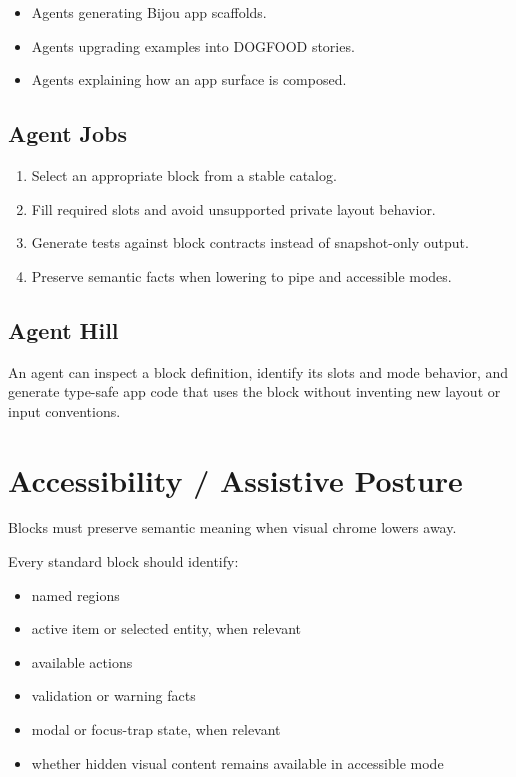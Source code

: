\begin{itemize}
\tightlist
\item
  Agents generating Bijou app scaffolds.
\item
  Agents upgrading examples into DOGFOOD stories.
\item
  Agents explaining how an app surface is composed.
\end{itemize}

\subsection{Agent Jobs}\label{record-128-agent-jobs}

\begin{enumerate}
\def\labelenumi{\arabic{enumi}.}
\tightlist
\item
  Select an appropriate block from a stable catalog.
\item
  Fill required slots and avoid unsupported private layout behavior.
\item
  Generate tests against block contracts instead of snapshot-only output.
\item
  Preserve semantic facts when lowering to pipe and accessible modes.
\end{enumerate}

\subsection{Agent Hill}\label{record-128-agent-hill}

An agent can inspect a block definition, identify its slots and mode behavior, and generate type-safe app code that uses the block without inventing new layout or input conventions.

\section{Accessibility / Assistive Posture}\label{record-128-accessibility-assistive-posture}

Blocks must preserve semantic meaning when visual chrome lowers away.

Every standard block should identify:

\begin{itemize}
\tightlist
\item
  named regions
\item
  active item or selected entity, when relevant
\item
  available actions
\item
  validation or warning facts
\item
  modal or focus-trap state, when relevant
\item
  whether hidden visual content remains available in accessible mode
\end{itemize}

